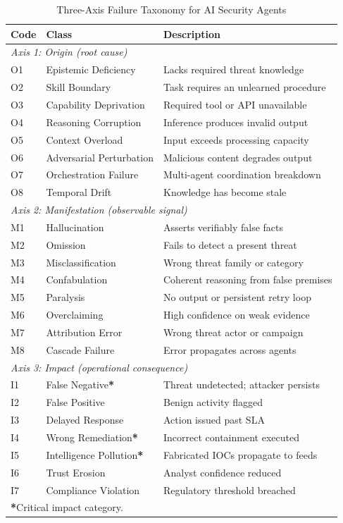 \documentclass[journal,compsoc]{IEEEtran}
\begin{document}
\begin{table}[t]
\caption{Three-Axis Failure Taxonomy for AI Security Agents}
\label{tab:taxonomy_mag}
\centering
\footnotesize
\setlength{\tabcolsep}{3pt}
\begin{tabular}{p{0.85cm} p{2.5cm} p{4.0cm}}
\toprule
\textbf{Code} & \textbf{Class} & \textbf{Description} \\
\midrule
\multicolumn{3}{l}{\textit{Axis 1: Origin (root cause)}} \\
O1 & Epistemic Deficiency & Lacks required threat knowledge \\
O2 & Skill Boundary & Task requires an unlearned procedure \\
O3 & Capability Deprivation & Required tool or API unavailable \\
O4 & Reasoning Corruption & Inference produces invalid output \\
O5 & Context Overload & Input exceeds processing capacity \\
O6 & Adversarial Perturbation & Malicious content degrades output \\
O7 & Orchestration Failure & Multi-agent coordination breakdown \\
O8 & Temporal Drift & Knowledge has become stale \\
\midrule
\multicolumn{3}{l}{\textit{Axis 2: Manifestation (observable signal)}} \\
M1 & Hallucination & Asserts verifiably false facts \\
M2 & Omission & Fails to detect a present threat \\
M3 & Misclassification & Wrong threat family or category \\
M4 & Confabulation & Coherent reasoning from false premises \\
M5 & Paralysis & No output or persistent retry loop \\
M6 & Overclaiming & High confidence on weak evidence \\
M7 & Attribution Error & Wrong threat actor or campaign \\
M8 & Cascade Failure & Error propagates across agents \\
\midrule
\multicolumn{3}{l}{\textit{Axis 3: Impact (operational consequence)}} \\
I1 & False Negative\hfill\textbf{*} & Threat undetected; attacker persists \\
I2 & False Positive & Benign activity flagged \\
I3 & Delayed Response & Action issued past SLA \\
I4 & Wrong Remediation\hfill\textbf{*} & Incorrect containment executed \\
I5 & Intelligence Pollution\hfill\textbf{*} & Fabricated IOCs propagate to feeds \\
I6 & Trust Erosion & Analyst confidence reduced \\
I7 & Compliance Violation & Regulatory threshold breached \\
\bottomrule
\multicolumn{3}{l}{\footnotesize \textbf{*}\;Critical impact category.} \\
\end{tabular}
\end{table}
\end{document}
